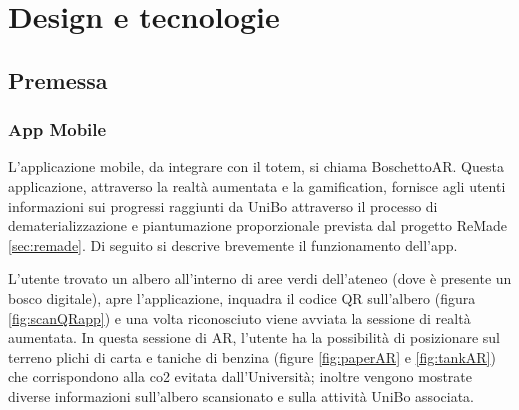 \chapter{Design e tecnologie}
\section{Premessa}
\subsection{App Mobile}
L'applicazione mobile, da integrare con il totem, si chiama BoschettoAR. Questa applicazione, attraverso la realtà aumentata e la gamification, fornisce agli utenti informazioni sui progressi raggiunti da UniBo attraverso il processo di dematerializzazione e piantumazione proporzionale prevista dal progetto ReMade \ref{sec:remade}. Di seguito si descrive brevemente il funzionamento dell'app.

L'utente trovato un albero all'interno di aree verdi dell'ateneo (dove è presente un bosco digitale), apre l'applicazione, inquadra il codice QR sull'albero (figura \ref{fig:scanQRapp}) e una volta riconosciuto viene avviata la sessione di realtà aumentata. In questa sessione di AR, l'utente ha la possibilità di posizionare sul terreno plichi di carta e taniche di benzina (figure \ref{fig:paperAR} e \ref{fig:tankAR}) che corrispondono alla co2 evitata dall'Università; inoltre vengono mostrate diverse informazioni sull'albero scansionato e sulla attività UniBo associata.

